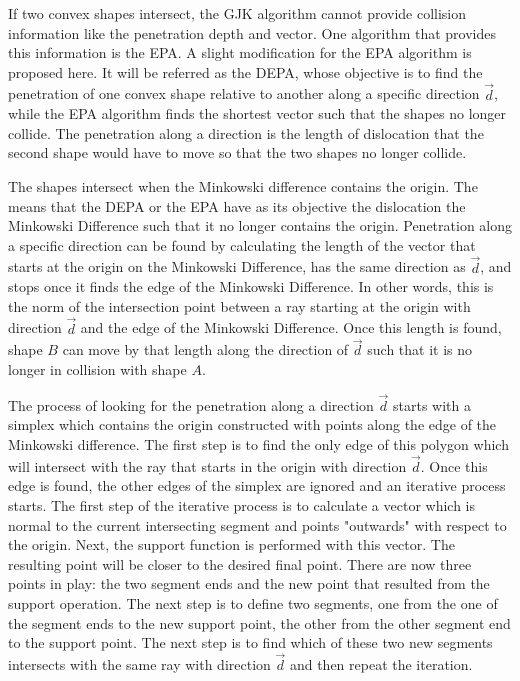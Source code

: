 \par If two convex shapes intersect, the \ac{GJK} algorithm cannot provide collision information like the penetration depth and vector. One algorithm that provides this information is the \ac{EPA}.
A slight modification for the \ac{EPA} algorithm is proposed here. It will be referred as the \acl{DEPA}, whose objective is to find the penetration of one convex shape relative to another along a specific direction $\overrightarrow{d}$, while the \ac{EPA} algorithm finds the shortest vector such that the shapes no longer collide. The penetration along a direction is the length of dislocation that the second shape would have to move so that the two shapes no longer collide. 
\par The shapes intersect when the Minkowski difference contains the origin. The means that the \ac{DEPA} or the \ac{EPA} have as its objective the dislocation the Minkowski Difference such that it no longer contains the origin. Penetration along a specific direction can be found by calculating the length of the vector that starts at the origin on the Minkowski Difference, has the same direction as $\overrightarrow{d}$, and stops once it finds the edge of the Minkowski Difference. In other words, this is the norm of the intersection point between a ray starting at the origin with direction $\overrightarrow{d}$ and the edge of the Minkowski Difference. Once this length is found, shape $B$ can move by that length along the direction of $\overrightarrow{d}$ such that it is no longer in collision with shape $A$.
\par The process of looking for the penetration along a direction $\overrightarrow{d}$ starts with a simplex which contains the origin constructed with points along the edge of the Minkowski difference. The first step is to find the only edge of this polygon which will intersect with the ray that starts in the origin with direction $\overrightarrow{d}$. Once this edge is found, the other edges of the simplex are ignored and an iterative process starts. The first step of the iterative process is to calculate a vector which is normal to the current intersecting segment and points "outwards" with respect to the origin. Next, the support function is performed with this vector. The resulting point will be closer to the desired final point. There are now three points in play: the two segment ends and the new point that resulted from the support operation. The next step is to define two segments, one from the one of the segment ends to the new support point, the other from the other segment end to the support point. The next step is to find which of these two new segments intersects with the same ray with direction $\overrightarrow{d}$ and then repeat the iteration. 




